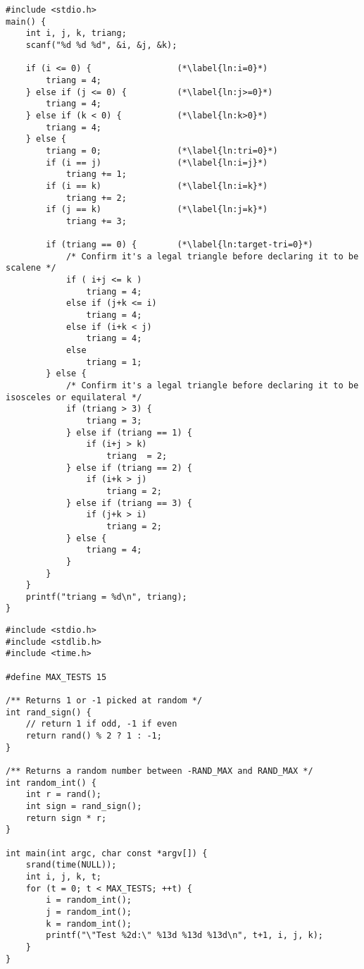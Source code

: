\documentclass{article}
\newenvironment{captionedlisting}{}{}
\begin{document}
\newpage
\begin{captionedlisting}
  \label{lst:tritype-single}
  \begin{lstlisting}
#include <stdio.h>
main() {
    int i, j, k, triang;
    scanf("%d %d %d", &i, &j, &k);

    if (i <= 0) {                 (*\label{ln:i=0}*)
        triang = 4;
    } else if (j <= 0) {          (*\label{ln:j>=0}*)
        triang = 4;
    } else if (k < 0) {           (*\label{ln:k>0}*)
        triang = 4;
    } else {
        triang = 0;               (*\label{ln:tri=0}*)
        if (i == j)               (*\label{ln:i=j}*)
            triang += 1;
        if (i == k)               (*\label{ln:i=k}*) 
            triang += 2;
        if (j == k)               (*\label{ln:j=k}*) 
            triang += 3;

        if (triang == 0) {        (*\label{ln:target-tri=0}*)
            /* Confirm it's a legal triangle before declaring it to be scalene */
            if ( i+j <= k ) 
                triang = 4;
            else if (j+k <= i)
                triang = 4;
            else if (i+k < j)
                triang = 4;
            else 
                triang = 1;
        } else {
            /* Confirm it's a legal triangle before declaring it to be isosceles or equilateral */
            if (triang > 3) {
                triang = 3;
            } else if (triang == 1) {
                if (i+j > k) 
                    triang  = 2;
            } else if (triang == 2) {
                if (i+k > j)
                    triang = 2;
            } else if (triang == 3) {
                if (j+k > i)
                    triang = 2;
            } else {
                triang = 4;
            }
        }
    } 
    printf("triang = %d\n", triang);
}
  \end{lstlisting}
\end{captionedlisting}

\begin{captionedlisting}
  \label{lst:rand-test-gen}
  \begin{lstlisting}
#include <stdio.h>
#include <stdlib.h>
#include <time.h>

#define MAX_TESTS 15

/** Returns 1 or -1 picked at random */
int rand_sign() {
    // return 1 if odd, -1 if even
    return rand() % 2 ? 1 : -1;
}

/** Returns a random number between -RAND_MAX and RAND_MAX */
int random_int() {
    int r = rand();
    int sign = rand_sign();
    return sign * r;
}

int main(int argc, char const *argv[]) {
    srand(time(NULL));
    int i, j, k, t;
    for (t = 0; t < MAX_TESTS; ++t) {
        i = random_int();
        j = random_int();
        k = random_int();
        printf("\"Test %2d:\" %13d %13d %13d\n", t+1, i, j, k);
    }
}
  \end{lstlisting}
\end{captionedlisting}
\end{document}
